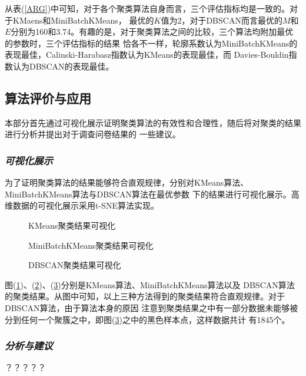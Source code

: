 \documentclass{acm_proc_article-sp}
\begin{document}
从表(\ref{ARG})中可知，对于各个聚类算法自身而言，三个评估指标均是一致的。对于KMaens和MiniBatchKMeans，
最优的$K$值为2，对于DBSCAN而言最优的$M$和$E$分别为160和3.74。有趣的是，对于聚类算法之间的比较，三个算法均附加最优的参数时，三个评估指标的结果
恰各不一样，轮廓系数认为MiniBatchKMeans的表现最佳，Calinski-Harabasz指数认为KMeans的表现最佳，而
Davies-Bouldin指数认为DBSCAN的表现最佳。




\subsection{\textsf{算法评价与应用}}
本部分首先通过可视化展示证明聚类算法的有效性和合理性，随后将对聚类的结果进行分析并提出对于调查问卷结果的
一些建议。

\subsubsection{\textit{可视化展示}}
为了证明聚类算法的结果能够符合直观规律，分别对KMeans算法、MiniBatchKMeans算法与DBSCAN算法在最优参数
下的结果进行可视化展示。高维数据的可视化展示采用t-SNE算法实现。

\begin{figure}[!htb]
\centering
{}
\caption{KMeans聚类结果可视化}
\label{PKM}
\end{figure}

\begin{figure}[!htb]
\centering
{}
\caption{MiniBatchKMeans聚类结果可视化}
\label{PMK}
\end{figure}

\begin{figure}[!htb]
\centering
{}
\caption{DBSCAN聚类结果可视化}
\label{PDS}
\end{figure}

图(\ref{PKM})、(\ref{PMK})、(\ref{PDS})分别是KMeans算法、MiniBatchKMeans算法以及
DBSCAN算法的聚类结果。从图中可知，以上三种方法得到的聚类结果符合直观规律。对于DBSCAN算法，由于算法本身的原因
注意到聚类结果之中有一部分数据未能够被分到任何一个聚簇之中，即图(\ref{PDS})之中的黑色样本点，这样数据共计
有1845个。

\subsubsection{\textit{分析与建议}}
？？？？？
\end{document}
